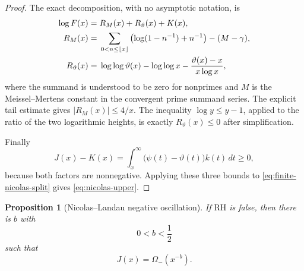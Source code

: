 \documentclass[11pt]{amsart}
\newtheorem{proposition}[theorem]{Proposition}
\theoremstyle{definition}
\theoremstyle{remark}
\numberwithin{equation}{section}
\newcommand{\RH}{\mathrm{RH}}
\newcommand{\euler}{\gamma}
\begin{document}
\begin{proof}
The exact decomposition, with no asymptotic notation, is
\begin{align}
 \log F(x)={}&R_M(x)+R_\vartheta(x)+K(x),
 \label{eq:finite-nicolas-split}\\
 R_M(x)={}&
 \sum_{0<n\le\lfloor x\rfloor}
 \left(\log(1-n^{-1})+n^{-1}\right)-(M-\euler),\notag\\
 R_\vartheta(x)={}&
 \log\log\vartheta(x)-\log\log x
 -\frac{\vartheta(x)-x}{x\log x},\notag
\end{align}
where the summand is understood to be zero for nonprimes and $M$ is the
Meissel--Mertens constant in the convergent prime summand series.  The
explicit tail estimate gives $|R_M(x)|\le4/x$.  The inequality
$\log y\le y-1$, applied to the ratio of the two logarithmic heights, is
exactly $R_\vartheta(x)\le0$ after simplification.

Finally
\[
 J(x)-K(x)=\int_x^\infty
   \bigl(\psi(t)-\vartheta(t)\bigr)k(t)\,dt\ge0,
\]
because both factors are nonnegative.  Applying these three bounds to
\eqref{eq:finite-nicolas-split} gives \eqref{eq:nicolas-upper}.
\end{proof}

\begin{proposition}[Nicolas--Landau negative oscillation]
\label{prop:nicolas-landau}
If $\RH$ is false, then there is $b$ with
\begin{equation}\label{eq:b-range}
  0<b<\frac12
\end{equation}
such that
\begin{equation}\label{eq:J-omega}
  J(x)=\Omega_-(x^{-b}).
\end{equation}
\end{proposition}
\end{document}
